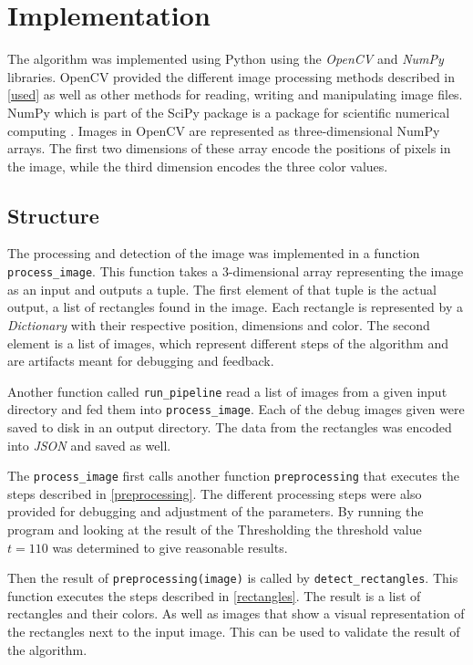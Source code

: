 \section{Implementation}

The algorithm was implemented using Python using the \textit{OpenCV} and
\textit{NumPy} libraries. OpenCV provided the different image processing methods
described in \ref{used} as well as other methods for reading, writing
and manipulating image files. NumPy which is part of the SciPy package is a
package for scientific numerical computing \cite{scipy}. Images in OpenCV are
represented as three-dimensional NumPy arrays. The first two dimensions of these
array encode the positions of pixels in the image, while the third dimension
encodes the three color values.

\subsection{Structure}

The processing and detection of the image was implemented in a function
\texttt{process\_image}. This function takes a 3-dimensional array representing
the image as an input and outputs a tuple. The first element of that tuple is
the actual output, a list of rectangles found in the image. Each rectangle is
represented by a \textit{Dictionary} with their respective position, dimensions
and color. The second element is a list of images, which represent different steps
of the algorithm and are artifacts meant for debugging and feedback.

Another function called \texttt{run\_pipeline} read a list of images from a
given input directory and fed them into \texttt{process\_image}. Each of the
debug images given were saved to disk in an output directory. The data from the
rectangles was encoded into \textit{JSON} and saved as well.

The \texttt{process\_image} first calls another function \texttt{preprocessing}
that executes the steps described in \ref{preprocessing}. The different processing
steps were also provided for debugging and adjustment of the parameters. By
running the program and looking at the result of the Thresholding the threshold
value $t = 110$ was determined to give reasonable results.

Then the result of \texttt{preprocessing(image)} is called by
\texttt{detect\_rectangles}. This function executes the steps described in
\ref{rectangles}. The result is a list of rectangles and their colors. As
well as images that show a visual representation of the rectangles next to
the input image. This can be used to validate the result of the algorithm.


